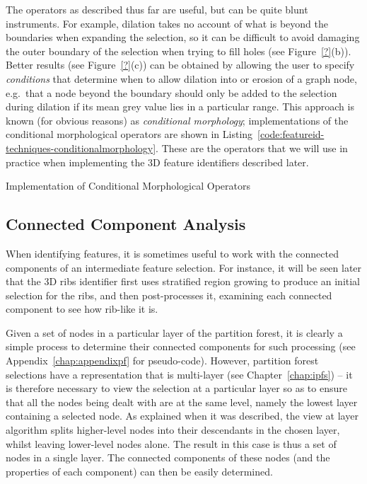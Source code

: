 The operators as described thus far are useful, but can be quite blunt instruments. For example, dilation takes no account of what is beyond the boundaries when expanding the selection, so it can be difficult to avoid damaging the outer boundary of the selection when trying to fill holes (see Figure~\ref{?}(b)). Better results (see Figure~\ref{?}(c)) can be obtained by allowing the user to specify \emph{conditions} that determine when to allow dilation into or erosion of a graph node, e.g.~that a node beyond the boundary should only be added to the selection during dilation if its mean grey value lies in a particular range. This approach is known (for obvious reasons) as \emph{conditional morphology}; implementations of the conditional morphological operators are shown in Listing~\ref{code:featureid-techniques-conditionalmorphology}. These are the operators that we will use in practice when implementing the 3D feature identifiers described later.

\begin{stulisting}[p]
\caption{Implementation of Conditional Morphological Operators}
\label{code:featureid-techniques-conditionalmorphology}

\end{stulisting}

\subsection{Connected Component Analysis}

When identifying features, it is sometimes useful to work with the connected components of an intermediate feature selection. For instance, it will be seen later that the 3D ribs identifier first uses stratified region growing to produce an initial selection for the ribs, and then post-processes it, examining each connected component to see how rib-like it is.

Given a set of nodes in a particular layer of the partition forest, it is clearly a simple process to determine their connected components for such processing (see Appendix~\ref{chap:appendixpf} for pseudo-code). However, partition forest selections have a representation that is multi-layer (see Chapter~\ref{chap:ipfs}) -- it is therefore necessary to view the selection at a particular layer so as to ensure that all the nodes being dealt with are at the same level, namely the lowest layer containing a selected node. As explained when it was described, the view at layer algorithm splits higher-level nodes into their descendants in the chosen layer, whilst leaving lower-level nodes alone. The result in this case is thus a set of nodes in a single layer. The connected components of these nodes (and the properties of each component) can then be easily determined.

